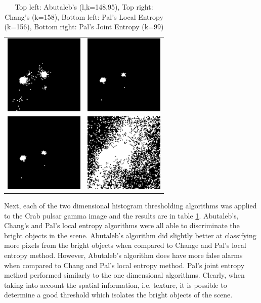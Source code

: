 \documentclass[journal]{IEEEtran}
\begin{document}
\begin{table}[!h]
\centering
\begin{tabular}{cc}
\includegraphics[width=1.5in]{../results/crabpulsar-gamma_abutaleb.png} &
\includegraphics[width=1.5in]{../results/crabpulsar-gamma_chang.png} \\
\newline
\includegraphics[width=1.5in]{../results/crabpulsar-gamma_le_pal.png} &
\includegraphics[width=1.5in]{../results/crabpulsar-gamma_je_pal.png} \\
\end{tabular}
\caption{Top left: Abutaleb's (l,k=148,95), Top right: Chang's (k=158), Bottom left: Pal's Local Entropy (k=156), Bottom right: Pal's Joint Entropy (k=99)}
\label{tab:gammaTable2}
\end{table}

\par Next, each of the two dimensional histogram thresholding algorithms was applied to the Crab pulsar gamma image and the results are in table \ref{tab:gammaTable2}. Abutaleb's, Chang's and Pal's local entropy algorithms were all able to discriminate the bright objects in the scene. Abutaleb's algorithm did slightly better at classifying more pixels from the bright objects when compared to Change and Pal's local entropy method. However, Abutaleb's algorithm does have more false alarms when compared to Chang and Pal's local entropy method. Pal's joint entropy method performed similarly to the one dimensional algorithms. Clearly, when taking into account the spatial information, i.e. texture, it is possible to determine a good threshold which isolates the bright objects of the scene.
\end{document}
